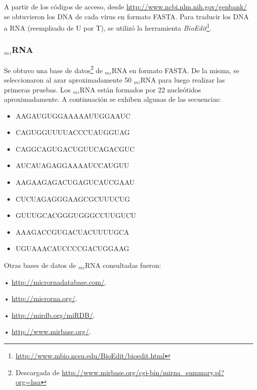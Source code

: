 	\par A partir de los códigos de acceso, desde \url{http://www.ncbi.nlm.nih.gov/genbank/} se obtuvieron los DNA de cada virus en formato FASTA. Para traducir los DNA a RNA (reemplzado de \textsc{U} por \textsc{T}), se utilizó la herramienta \emph{BioEdit}\footnote{\url{http://www.mbio.ncsu.edu/BioEdit/bioedit.html}}. 


\subsubsection{$_m$$_i$RNA}
	\par Se obtuvo una base de datos\footnote{Descargada de \url{http://www.mirbase.org/cgi-bin/mirna\_summary.pl?org=hsa}} de $_m$$_i$RNA en formato FASTA. De la misma, se seleccionaron al azar aproximadamente 50 $_m$$_i$RNA para luego realizar las primeras pruebas. Los $_m$$_i$RNA están formados por 22 nucleótidos aproximadamente. A continuación se exhiben algunas de las secuencias: 
\begin{itemize}
	\item \textsc{AAGAUGUGGAAAAAUUGGAAUC}
	\item \textsc{CAGUGGUUUUACCCUAUGGUAG}
	\item \textsc{CAGGCAGUGACUGUUCAGACGUC}
	\item \textsc{AUCAUAGAGGAAAAUCCAUGUU}
	\item \textsc{AAGAAGAGACUGAGUCAUCGAAU}
	\item \textsc{CUCUAGAGGGAAGCGCUUUCUG}
	\item \textsc{GUUUGCACGGGUGGGCCUUGUCU}
	\item \textsc{AAAGACCGUGACUACUUUUGCA}
	\item \textsc{UGUAAACAUCCCCGACUGGAAG}
\end{itemize}
		
	\par Otras bases de datos de $_m$$_i$RNA consultadas fueron: 
		\par \hspace*{1cm} • \url{http://micrornadatabase.com/}.
		\par \hspace*{1cm} • \url{http://microrna.org/}.
		\par \hspace*{1cm} • \url{http://mirdb.org/miRDB/}.
		\par \hspace*{1cm} • \url{http://www.mirbase.org/}.

